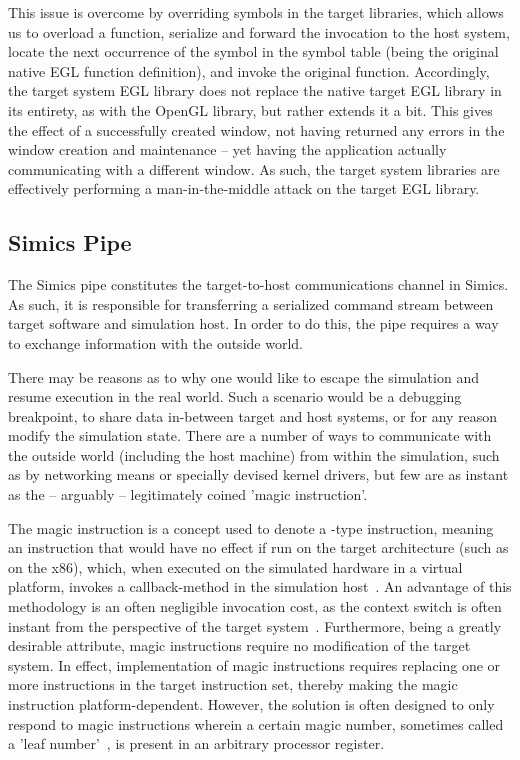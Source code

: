 This issue is overcome by overriding symbols in the target libraries, which allows us to overload a function, serialize and forward the invocation to the host system, locate the next occurrence of the symbol in the symbol table (being the original native EGL function definition), and invoke the original function.
Accordingly, the target system EGL library does not replace the native target EGL library in its entirety, as with the OpenGL library, but rather extends it a bit.
This gives the effect of a successfully created window, not having returned any errors in the window creation and maintenance -- yet having the application actually communicating with a different window.
As such, the target system libraries are effectively performing a man-in-the-middle attack on the target EGL library.

\subsection{Simics Pipe}
\label{sec:proposedsolutionandimplementation_simicspipe}
The Simics pipe constitutes the target-to-host communications channel in Simics.
As such, it is responsible for transferring a serialized command stream between target software and simulation host.
In order to do this, the pipe requires a way to exchange information with the outside world.

There may be reasons as to why one would like to escape the simulation and resume execution in the real world.
Such a scenario would be a debugging breakpoint, to share data in-between target and host systems, or for any reason modify the simulation state.
There are a number of ways to communicate with the outside world (including the host machine) from within the simulation, such as by networking means or specially devised kernel drivers, but few are as instant as the -- arguably -- legitimately coined 'magic instruction'.

The magic instruction is a concept used to denote a -type instruction, meaning an instruction that would have no effect if run on the target architecture (such as  on the x86), which, when executed on the simulated hardware in a virtual platform, invokes a callback-method in the simulation host~.
An advantage of this methodology is an often negligible invocation cost, as the context switch is often instant from the perspective of the target system~.
Furthermore, being a greatly desirable attribute, magic instructions require no modification of the target system.
In effect, implementation of magic instructions requires replacing one or more instructions in the target instruction set, thereby making the magic instruction platform-dependent.
However, the solution is often designed to only respond to magic instructions wherein a certain magic number, sometimes called a 'leaf number'~, is present in an arbitrary processor register.

